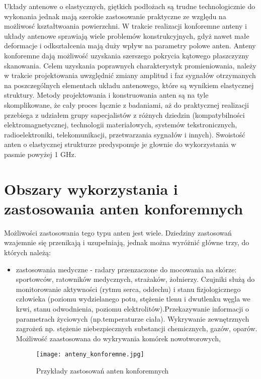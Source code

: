 \begin{itemize}
\begin{itemize}
Układy antenowe o elastycznych, giętkich podłożach są trudne technologicznie do wykonania jednak mają szerokie zastosowanie praktyczne ze względu na możliwosć kształtwoania powierzchni. 
W trakcie realizacji konforemne anteny i układy antenowe sprawiają wiele problemów konstrukcyjnych, gdyż nawet małe deformacje i odkształcenia mają duży wpływ na parametry polowe anten. 
Anteny konforemne dają możliwość uzyskania szerszego pokrycia kątowego płaszczyzny skanowania. Celem uzyskania poprawnych charakterystyk promieniowania, należy w trakcie projektowania uwzględnić zmiany amplitud i faz sygnałów otrzymanych na poszczególnych elementach układu antenowego, które są wynikiem elastycznej struktury.    
Metody projektowania i konstruowania anten są na tyle skomplikowane, że cały proces łącznie z badaniami, aż do praktycznej realizacji przebiega z udziałem grupy sapecjalistów z różnych dziedzin (kompatybilności elektromagnetycznej, technologii materiałowych, systemów tekstronicznych, radioelektroniki, telekomunikacji, przetwarzania sygnałów i innych). Swoistość anten o elastycznej strukturze predysponuje je głownie do wykorzystania w pasmie powyżej 1 GHz.     

\section{Obszary wykorzystania i zastosowania anten konforemnych}

Możliwości zastosowania tego typu anten jest wiele. Dziedziny zastosowań wzajemnie się przenikają i uzupełniają, jednak można wyróżnić główne trzy, do których należą:

\begin{itemize}\setlength{\itemsep}{0pt}
	
	\item zastosowania medyczne - radary przenzaczone do mocowania na skórze: sportowców, ratowników medycznych, strażaków, żołnierzy. Czujniki służą do monitorowanie aktywności (rytmu serca, oddechu) i stanu fizjologicznego człowieka (poziomu wydzielanego potu, stężenie tlenu i dwutlenku węgla we krwi, stanu odwodnienia, poziomu elektrolitów).Przekazywanie informacji o parametrach życiowych (np.temperaturze ciała). Wykrywanie zewnętrznych zagrożeń np. stężenie niebezpiecznych substancji chemicznych, gazów, oparów. Możliwość zaastosowana do wykrywania komórek nowotworowych,  

\begin{figure}[h!]
\centering
	\texttt{[image: anteny\_konforemne.jpg]}
	\caption{Przykłady zastosowań anten konforemnych}
\end{figure}


\end{itemize}
\end{itemize}
\end{itemize}

